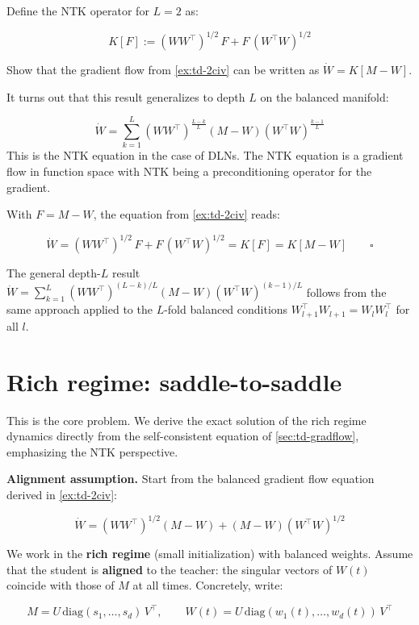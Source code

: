 \documentclass[11pt]{article}
\begin{document}
\begin{exercise}
\label{ex:td-2d}
Define the NTK operator for \(L = 2\) as:

\[K[F] := (WW^\top)^{1/2}\, F + F\, (W^\top W)^{1/2}\]

Show that the gradient flow from \cref{ex:td-2civ} can be written as
\(\dot{W} = K[M - W]\).

It turns out that this result generalizes to depth \(L\) on the balanced
manifold:

\[\dot{W} = \sum_{k=1}^{L} (WW^\top)^{\frac{L-k}{L}} (M - W) (W^\top W)^{\frac{k-1}{L}}\]
This is the NTK equation in the case of DLNs. The NTK equation is a gradient flow in function space with NTK being a preconditioning operator for the gradient.
\end{exercise}

\begin{solution}[ex:td-2d]
With \(F = M - W\), the equation from \cref{ex:td-2civ} reads:

\[\dot{W} = (WW^\top)^{1/2}\,F + F\,(W^\top W)^{1/2} = K[F] = K[M - W] \qquad \square\]

The general depth-\(L\) result
\(\dot{W} = \sum_{k=1}^{L}(WW^\top)^{(L-k)/L}(M-W)(W^\top W)^{(k-1)/L}\)
follows from the same approach applied to the \(L\)-fold balanced
conditions \(W_{l+1}^\top W_{l+1} = W_l W_l^\top\) for all \(l\).
\end{solution}

\section{Rich regime: saddle-to-saddle}
\label{sec:td-rich}

This is the core problem. We derive the exact solution of the rich
regime dynamics directly from the self-consistent equation of \cref{sec:td-gradflow},
emphasizing the NTK perspective.

\textbf{Alignment assumption.} Start from the balanced
gradient flow equation derived in \cref{ex:td-2civ}:

\[\dot{W} = (WW^\top)^{1/2}(M - W) + (M - W)(W^\top W)^{1/2}\]

We work in the \textbf{rich regime} (small initialization) with balanced
weights. Assume that the student is \textbf{aligned} to the teacher: the
singular vectors of \(W(t)\) coincide with those of \(M\) at all times.
Concretely, write:

\[M = U\,\text{diag}(s_1, \ldots, s_d)\,V^\top, \qquad W(t) = U\,\text{diag}(w_1(t), \ldots, w_d(t))\,V^\top\]
\end{document}
